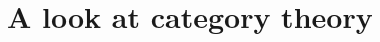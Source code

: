 \documentclass[14pt]{extarticle} %
\begin{document}
\section{A look at category theory}

% 
%
% 
%
% 




\newpage 



%
%
%
\end{document}
